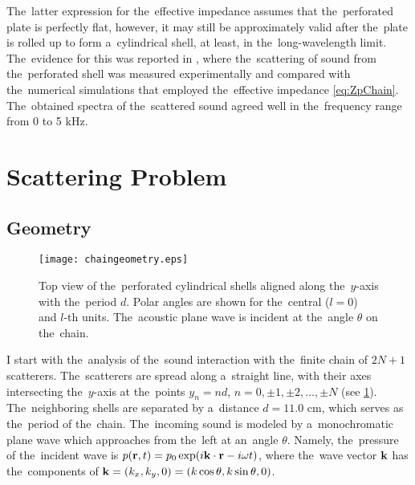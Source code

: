 The~latter expression for the~effective impedance assumes that the~perforated plate is perfectly flat, however, it may still be approximately valid after the~plate is rolled up to form a~cylindrical shell, at least, in the~long-wavelength limit.
The~evidence for this was reported in \cite{garcia2,deraa2}, where the~scattering of sound from the~perforated shell was measured experimentally and compared with the~numerical simulations that employed the~effective impedance \cref{eq:ZpChain}.
The~obtained spectra of the~scattered sound agreed well in the~frequency range from 0 to 5 kHz.



\section{Scattering Problem}

\subsection{Geometry}

\begin{figure}
\begin{center}
\texttt{[image: chaingeometry.eps]}
\caption{Top view of the~perforated cylindrical shells aligned along the~$y$-axis with the~period $d$. Polar angles are shown for the~central ($l=0$) and $l$-th units. The~acoustic plane wave is incident at the~angle $\theta$ on the~chain.}
\label{fig:geometryChain}
\end{center}
\end{figure}

I start with the~analysis of the~sound interaction with the~finite chain of $2N+1$ scatterers.
The~scatterers are spread along a~straight line, with their axes intersecting the~$y$-axis at the~points $y_n = nd$, $n=0,\pm1,\pm2,\dots, \pm N$ (see \cref{fig:geometryChain}).
The~neighboring shells are separated by a~distance $d=11.0$ cm, which serves as the~period of the~chain.
The~incoming sound is modeled by a~monochromatic plane wave which approaches from the~left at an~angle $\theta$.
Namely, the~pressure of the~incident wave is $p({\bf r},t)=p_0\exp(i{\bf k\cdot r} -i \omega t)$, where the~wave vector ${\bf k}$ has the~components of ${\bf k} = (k_x,k_y,0) = (k \cos\theta,k \sin\theta,0)$.

